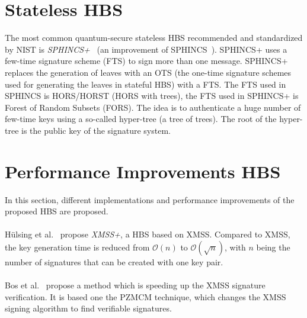 \section{Stateless HBS}
The most common quantum-secure stateless HBS recommended and standardized by NIST is \textit{SPHINCS+}~\cite{tweakable_basispaper_sphincs_2019} (an improvement of SPHINCS~\cite{sphincs_old_version_2015}).
SPHINCS+ uses a few-time signature scheme (FTS) to sign more than one message.
SPHINCS+ replaces the generation of leaves with an OTS (the one-time signature schemes used for generating the leaves in stateful HBS) with a FTS.
The FTS used in SPHINCS is HORS/HORST (HORS with trees), the FTS used in SPHINCS+ is Forest of Random Subsets (FORS). The idea is to authenticate a huge number of few-time keys using a so-called hyper-tree (a tree of trees). The root of the hyper-tree is the public key of the signature system.
~\cite{tweakable_basispaper_sphincs_2019,sphincs+_submission_nist_round2}

\section{Performance Improvements HBS}
In this section, different implementations and performance improvements of the proposed HBS are proposed.
\\ \\
Hülsing et al.~\cite{xmss+_2018} propose \textit{XMSS+}, a HBS based on XMSS. Compared to XMSS, the key generation time is reduced from $\mathcal{O}(n)$ to $\mathcal{O}(\sqrt{n})$, with $n$ being the number of signatures that can be created with one key pair.
\\ \\
Bos et al.~\cite{xmss_rapidly_verif_sign_2020} propose a method which is speeding up the XMSS signature verification. It is based one the PZMCM technique, which changes the XMSS signing algorithm to find verifiable signatures.








